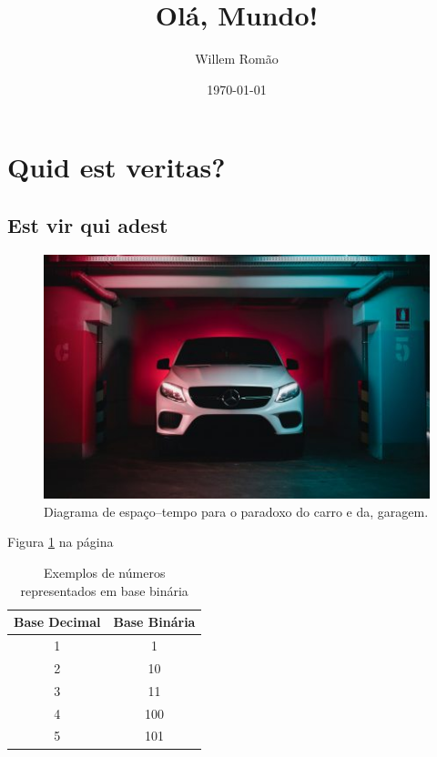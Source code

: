 \documentclass[12pt, a4paper]{article}
\title{Olá, Mundo!}
\author{Willem Romão}
\date{\today}
\begin{document}
	\maketitle
	\begin{abstract}
		\lipsum[1]
	\end{abstract}
	
	\section{Quid est veritas?}
		\lipsum[2]
		
		\subsection{Est vir qui adest}
			\lipsum[3-4]
			
			\begin{figure}[!htpb]
				\centering
				\includegraphics[width=0.5\textheight]{car-garage.jpg}
				\caption{Diagrama de espaço--tempo para o paradoxo do carro e da, 
					garagem.}
				\label{fig: car-garage}
				
			\end{figure}
		
		Figura \ref{fig: car-garage} na página \pageref{fig: car-garage}
		
		\begin{table}[!htbp]
			\centering
			\caption{Exemplos de números representados em base binária}
			\label{tab: binary}
			\begin{tabular}{c|c}
				 Base Decimal & Base Binária \\ \hline
				 1 & 1 \\
				 2 & 10 \\
				 3 & 11 \\
				 4 & 100 \\
				 5 & 101 
				 
			\end{tabular}
		\end{table}
			
\end{document}
